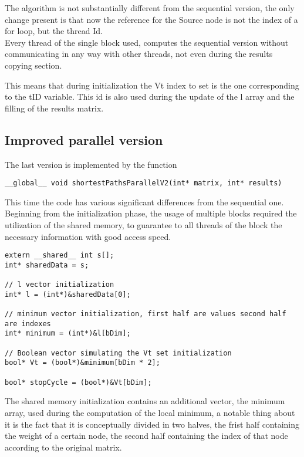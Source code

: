 \documentclass[
	a4paper, %
	12pt, %
]{class}
\begin{document}
The algorithm is not substantially different from the sequential version, the only change present is that now the reference for the
Source node is not the index of a for loop, but the thread Id.\\

Every thread of the single block used, computes the sequential version without communicating in any way with other threads, not even during
the results copying section.

This means that during initialization the Vt index to set is the one corresponding to the tID variable. This id is also used during the
update of the l array and the filling of the results matrix.\\

\subsection{Improved parallel version}
The last version is implemented by the function
\begin{verbatim}
__global__ void shortestPathsParallelV2(int* matrix, int* results)
\end{verbatim}

This time the code has various significant differences from the sequential one.\\

Beginning from the initialization phase, the usage of multiple blocks required the utilization of the shared memory, to guarantee to all threads of the block
the necessary information with good access speed.
\begin{verbatim}
extern __shared__ int s[];
int* sharedData = s;

// l vector initialization
int* l = (int*)&sharedData[0];

// minimum vector initialization, first half are values second half are indexes
int* minimum = (int*)&l[bDim];

// Boolean vector simulating the Vt set initialization
bool* Vt = (bool*)&minimum[bDim * 2];

bool* stopCycle = (bool*)&Vt[bDim];
\end{verbatim}

The shared memory initialization contains an additional vector, the minimum array, used during the computation of the local minimum, a notable thing about it
is the fact that it is conceptually divided in two halves, the frist half containing the weight of a certain node, the second half containing the index of that node
according to the original matrix.\\
\end{document}
